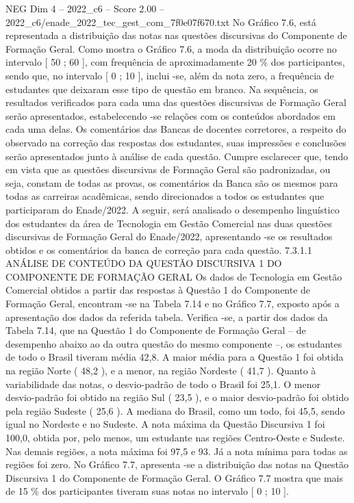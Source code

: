 \begin{textsample}{NEG Dim 4 – 2022\_c6 – Score 2.00 – 2022\_c6/enade\_2022\_tec\_gest\_com\_7f0e07f670.txt}
No Gráfico 7.6, está representada a distribuição das notas nas questões discursivas do Componente de Formação Geral.
Como mostra o Gráfico 7.6, a moda da distribuição ocorre no intervalo [ 50 ; 60 ], com frequência de aproximadamente 20 \% dos participantes, sendo que, no intervalo [ 0 ; 10 ], inclui -se, além da nota zero, a frequência de estudantes que deixaram esse tipo de questão em branco.
Na sequência, os resultados verificados para cada uma das questões discursivas de Formação Geral serão apresentados, estabelecendo -se relações com os conteúdos abordados em cada uma delas.
Os comentários das Bancas de docentes corretores, a respeito do observado na correção das respostas dos estudantes, suas impressões e conclusões serão apresentados junto à análise de cada questão.
Cumpre esclarecer que, tendo em vista que as questões discursivas de Formação Geral são padronizadas, ou seja, constam de todas as provas, os comentários da Banca são os mesmos para todas as carreiras acadêmicas, sendo direcionados a todos os estudantes que participaram do Enade/2022.
A seguir, será analisado o desempenho linguístico dos estudantes da área de Tecnologia em Gestão Comercial nas duas questões discursivas de Formação Geral do Enade/2022, apresentando -se os resultados obtidos e os comentários da banca de correção para cada questão. 7.3.1.1 ANÁLISE DE CONTEÚDO DA QUESTÃO DISCURSIVA 1 DO COMPONENTE DE FORMAÇÃO GERAL Os dados de Tecnologia em Gestão Comercial obtidos a partir das respostas à Questão 1 do Componente de Formação Geral, encontram -se na Tabela 7.14 e no Gráfico 7.7, exposto após a apresentação dos dados da referida tabela.
Verifica -se, a partir dos dados da Tabela 7.14, que na Questão 1 do Componente de Formação Geral – de desempenho abaixo ao da outra questão do mesmo componente –, os estudantes de todo o Brasil tiveram média 42,8.
A maior média para a Questão 1 foi obtida na região Norte ( 48,2 ), e a menor, na região Nordeste ( 41,7 ).
Quanto à variabilidade das notas, o desvio-padrão de todo o Brasil foi 25,1.
O menor desvio-padrão foi obtido na região Sul ( 23,5 ), e o maior desvio-padrão foi obtido pela região Sudeste ( 25,6 ).
A mediana do Brasil, como um todo, foi 45,5, sendo igual no Nordeste e no Sudeste.
A nota máxima da Questão Discursiva 1 foi 100,0, obtida por, pelo menos, um estudante nas regiões Centro-Oeste e Sudeste.
Nas demais regiões, a nota máxima foi 97,5 e 93.
Já a nota mínima para todas as regiões foi zero.
No Gráfico 7.7, apresenta -se a distribuição das notas na Questão Discursiva 1 do Componente de Formação Geral.
O Gráfico 7.7 mostra que mais de 15 \% dos participantes tiveram suas notas no intervalo [ 0 ; 10 ].

\end{textsample}
